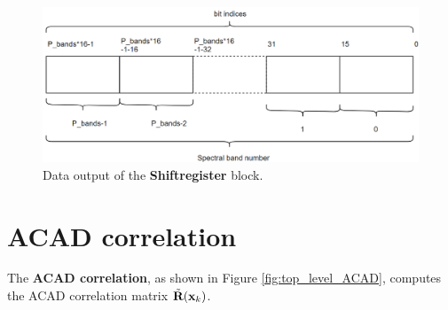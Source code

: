 \begin{figure}[H]
\centering
   \includegraphics[scale=0.3]{images/data_format_shiftregister.PNG}
  \caption{Data output of the \textbf{Shiftregister} block. } 
  \label{fig:shiftregister_data_out}
\end{figure}



\section{ACAD correlation}
\label{sec:correlation_hw}
The \textbf{ACAD correlation}, as shown in Figure \ref{fig:top_level_ACAD}, computes the ACAD correlation matrix $\Tilde{\textbf{R}}(\textbf{x}_k)$.
\\

\\






